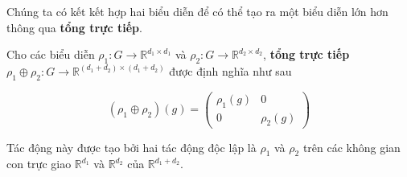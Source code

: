 Chúng ta có kết kết hợp hai biểu diễn để có thể tạo ra một biểu diễn lớn hơn thông qua \textbf{tổng trực tiếp}.

Cho các biểu diễn $\rho_1 : G \to \mathbb{R}^{d_1 \times d_1}$ và $\rho_2 : G \to \mathbb{R}^{d_2 \times d_2}$, \textbf{tổng trực tiếp} $\rho_1 \oplus \rho_2: G \to \mathbb{R}^{(d_1 + d_2) \times (d_1 + d_2)}$ được định nghĩa như sau 

$$
    (\rho_1 \oplus \rho_2)(g) = \begin{pmatrix}\rho_1(g) & 0 \\ 0 & \rho_2(g) \end{pmatrix} 
$$

Tác động này được tạo bởi hai tác động độc lập là $\rho_1$ và $\rho_2$ trên các không gian con trực giao $\mathbb{R}^{d_1}$ và  $\mathbb{R}^{d_2}$  của $\mathbb{R}^{d_1 + d_2}$.

